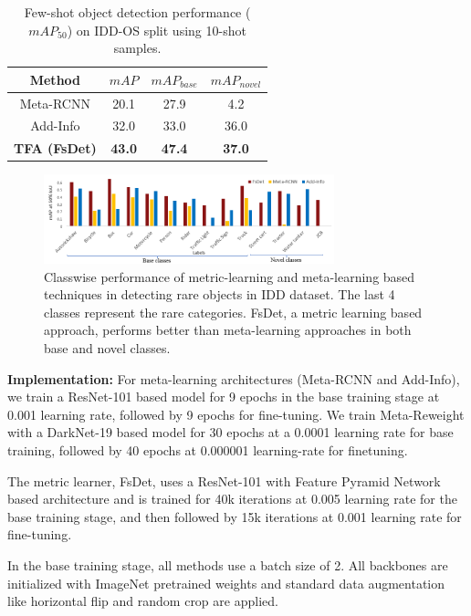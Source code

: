 \documentclass[letterpaper]{article} %
\begin{document}
\begin{table}[t]
      \caption{Few-shot object detection performance ($mAP_{50}$) on IDD-OS split using 10-shot samples.}
      \centering
      \begin{tabular}{c|c|c|c}
            \hline
            Method                   & $mAP$  & $mAP_{base}$ & $mAP_{novel}$ \\
            \hline
            Meta-RCNN & 20.1 & 27.9         & 4.2           \\
            Add-Info  & 32.0 & 33.0         & 36.0          \\
            \textbf{TFA (FsDet)} & \textbf{43.0} & \textbf{47.4} & \textbf{37.0}          \\
            \hline
      \end{tabular}
      \label{table4}
\end{table}

\begin{figure}[t]
      \centering
      \includegraphics[height=0.19\textwidth,width=0.75\textwidth]{accuracy_vfb.PNG}
      \caption{Classwise performance of metric-learning and meta-learning based techniques in detecting rare objects in IDD dataset. The last 4 classes represent the rare categories. FsDet, a metric learning based approach, performs better than meta-learning approaches in both base and novel classes.}
      \label{vfb_classwise}
\end{figure}

\textbf{Implementation: }
For meta-learning architectures (Meta-RCNN and Add-Info), we train a ResNet-101 based model for 9 epochs in the base training stage at 0.001 learning rate, followed by 9 epochs for fine-tuning. We train Meta-Reweight with a DarkNet-19 based model for 30 epochs at a 0.0001 learning rate for base training, followed by 40 epochs at 0.000001 learning-rate for finetuning.

The metric learner, FsDet, uses a ResNet-101 with Feature Pyramid Network based architecture and is trained for 40k iterations at 0.005 learning rate for the base training stage, and then followed by 15k iterations at 0.001 learning rate for fine-tuning.

In the base training stage, all methods use a batch size of 2. All backbones are initialized with ImageNet pretrained weights and standard data augmentation like horizontal flip and random crop are applied.
\end{document}
